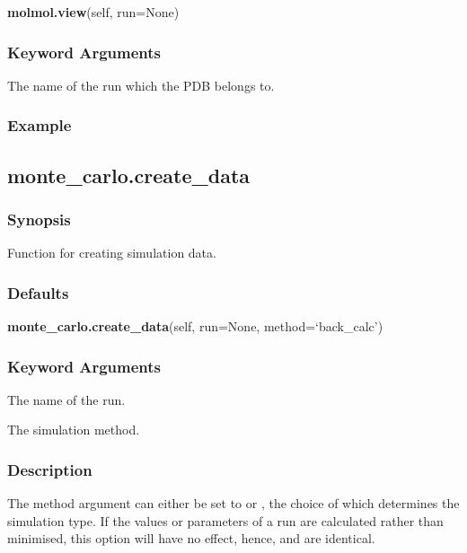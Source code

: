 \textsf{\textbf{molmol.view}(self, run=None)}


\subsubsection{Keyword Arguments}


  The name of the run which the PDB  belongs to.

\subsubsection{Example}





\newpage

\subsection{monte\_carlo.create\_data}


\subsubsection{Synopsis}

Function for creating simulation data.

\subsubsection{Defaults}

\textsf{\textbf{monte\_carlo.create\_data}(self, run=None, method=`back\_calc')}


\subsubsection{Keyword Arguments}


  The name of the run.

  The simulation method.

\subsubsection{Description}

The method argument can either be set to 
 or 
, the choice of which
determines the simulation type.  If the values or parameters of a run are calculated rather
than minimised,  this option will have no effect, hence, 
 and 
 are
identical.


